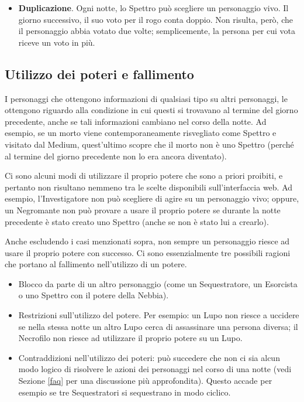 \documentclass[a4paper,10pt]{article}
\begin{document}
\begin{itemize}
 \item {\bf Duplicazione}. Ogni notte, lo Spettro può scegliere un personaggio vivo. Il giorno successivo, il suo voto per il rogo conta doppio. Non risulta, però, che il personaggio abbia votato due volte; semplicemente, la persona per cui vota riceve un voto in più.
 
%  

\end{itemize}


\subsection{Utilizzo dei poteri e fallimento}
\label{fallimento}

I personaggi che ottengono informazioni di qualsiasi tipo su altri personaggi, le ottengono riguardo alla condizione in cui questi si trovavano al termine del giorno precedente, anche se tali informazioni cambiano nel corso della notte.
Ad esempio, se un morto viene contemporaneamente risvegliato come Spettro e visitato dal Medium, quest'ultimo scopre che il morto non è uno Spettro (perché al termine del giorno precedente non lo era ancora diventato).

Ci sono alcuni modi di utilizzare il proprio potere che sono a priori proibiti, e pertanto non risultano nemmeno tra le scelte disponibili sull'interfaccia web. Ad esempio, l'Investigatore non può scegliere di agire su un personaggio vivo; oppure, un Negromante non può provare a usare il proprio potere se durante la notte precedente è stato creato uno Spettro (anche se non è stato lui a crearlo).

Anche escludendo i casi menzionati sopra, non sempre un personaggio riesce ad usare il proprio potere con successo.
Ci sono essenzialmente tre possibili ragioni che portano al fallimento nell'utilizzo di un potere.
\begin{itemize}
 \item Blocco da parte di un altro personaggio (come un Sequestratore, un Esorcista o uno Spettro con il potere della Nebbia).
 \item Restrizioni sull'utilizzo del potere. Per esempio: un Lupo non riesce a uccidere se nella stessa notte un altro Lupo cerca di assassinare una persona diversa; il Necrofilo non riesce ad utilizzare il proprio potere su un Lupo.
 \item Contraddizioni nell'utilizzo dei poteri: può succedere che non ci sia alcun modo logico di risolvere le azioni dei personaggi nel corso di una notte (vedi Sezione \ref{faq} per una discussione più approfondita). Questo accade per esempio se tre Sequestratori si sequestrano in modo ciclico.
\end{itemize}
\end{document}

